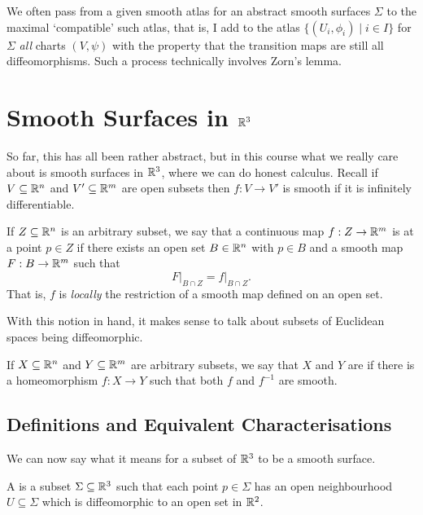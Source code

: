 \documentclass[a4paper]{scrartcl}
\begin{document}
\begin{remark}
    We often pass from a given smooth atlas for an abstract smooth surfaces $\Sigma$ to the maximal `compatible' such atlas, that is, I add to the atlas $\{(U_i, \phi_i) \mid i \in I\}$ for $\Sigma$ \emph{all} charts $(V, \psi)$ with the property that the transition maps are  still all diffeomorphisms. Such a process technically involves Zorn's lemma.
\end{remark}

\section{Smooth Surfaces in $\mathbb{R}^3$}

So far, this has all been rather abstract, but in this course what we really care about is smooth surfaces in $\mathbb{R}^3$, where we can do honest calculus. Recall if $V \subseteq \mathbb{R}^n$ and $V' \subseteq \mathbb{R}^m$ are open subsets then $f: V \rightarrow V'$ is smooth if it is infinitely differentiable.

\begin{definition}
    If $Z \subseteq \mathbb{R}^n$ is an arbitrary subset, we say that a continuous map $f: Z \rightarrow \mathbb{R}^m$ is  at a point $p \in Z$ if there exists an open set $B \in \mathbb{R}^n$ with $p \in B$ and a smooth map $F: B \rightarrow \mathbb{R}^m$ such that
    $$
\left.F\right|_{B \cap Z} = \left.f\right|_{B \cap Z}.
    $$
    That is, $f$ is \emph{locally} the restriction of a smooth map defined on an open set.
\end{definition}


With this notion in hand, it makes sense to talk about subsets of Euclidean spaces being diffeomorphic.

\begin{definition}
    If $X \subseteq \mathbb{R}^n$ and $Y \subseteq \mathbb{R}^m$ are arbitrary subsets, we say that $X$ and $Y$ are  if there is a homeomorphism $f: X \rightarrow Y$ such that both $f$ and $f^{-1}$ are smooth.
\end{definition}

\subsection{Definitions and Equivalent Characterisations}

We can now say what it means for a subset of $\mathbb{R}^3$ to be a smooth surface.

\begin{definition}
    A  is a subset $\Sigma \subseteq \mathbb{R}^3$ such that each point $p \in \Sigma$ has an open neighbourhood $U \subseteq \Sigma$ which is diffeomorphic to an open set in $\mathbb{R}^2$.
\end{definition}
\end{document}
